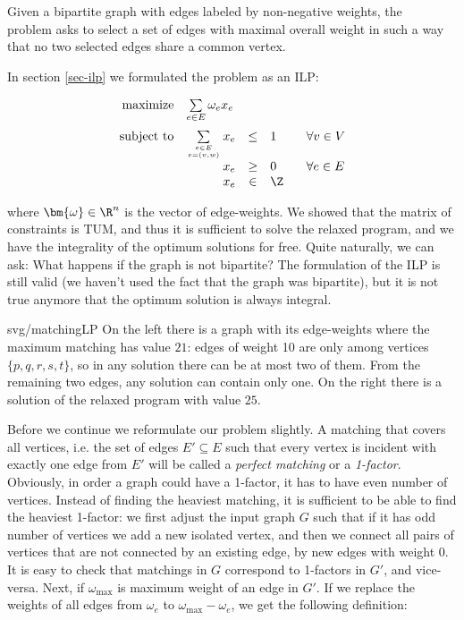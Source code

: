 {
  \renewcommand{\thedummy}{\ref{dfn:maxWBmatching}}
  \begin{dfn}
    Given a bipartite graph with edges labeled by non-negative weights, the\\ \maxWBmatching
    problem asks to select a set of edges with maximal overall weight in such a way that no
    two selected edges share a common vertex.
  \end{dfn}
}


In section \ref{sec-ilp} we formulated the problem as an ILP:

\begin{equation*}
\begin{array}{rrcll}
  {\rm maximize}     & \multicolumn{1}{l}{\sum\limits_{e\in E}\omega_ex_e}\\[3ex]
  {\rm subject\ to} & \sum\limits_{e\in E\atop e=(v,w)}x_e&\le&1& \;\;\;\forall v\in V\\
                          & x_e&\ge&0& \;\;\;\forall e\in E\\
                          & x_e&\in&\Z
\end{array}
\end{equation*}

\noindent
where $\bm{\omega}\in\R^n$ is the vector of edge-weights. We showed that the matrix of constraints is TUM,
and thus it is sufficient to solve the relaxed program, and we have the integrality of the optimum
solutions for free. Quite naturally, we can ask: What happens if the graph is not bipartite? The formulation
of the ILP is still valid (we haven't used the fact that the graph was bipartite), but it is not true
anymore that the optimum solution is always integral.

\begin{myfig}{0.8\textwidth}{svg/matchingLP}
  On the left there is a graph with its edge-weights where the maximum matching has value $21$:
  edges of weight 10 are only among vertices $\{p,q,r,s,t\}$, so in any solution there can be at most two of them.
  From the remaining two edges, any solution can contain only one. On the right there is a solution of
  the relaxed program with value $25$.
\end{myfig}

\noindent
Before we continue we reformulate our problem slightly. A matching that covers all vertices, i.e. the 
set of edges $E'\subseteq E$ such that every vertex is incident with exactly one edge from $E'$ will
be called a {\em perfect matching} or a {\em 1-factor}. Obviously, in order a graph could have a 1-factor, it
has to have even number of vertices. Instead of finding the heaviest matching, it is sufficient to be able
to find the heaviest 1-factor: we first adjust the input graph $G$ such that if it has odd number of vertices
we add a new isolated vertex, and then we connect all pairs of vertices that are not connected by an existing
edge, by new edges with weight 0. It is easy to check that matchings in $G$ correspond to 1-factors in $G'$,
and vice-versa. Next, if $\omega_{\max}$ is maximum weight of an edge in $G'$. If we replace the weights
of all edges from $\omega_e$ to $\omega_{\max}-\omega_e$, we get the following definition:

